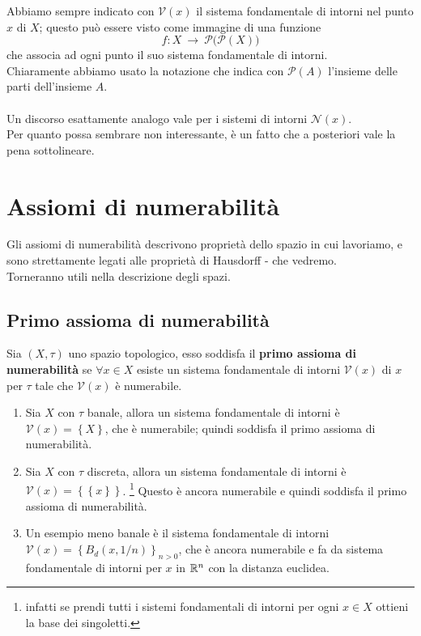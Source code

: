 \begin{remark} 
	Abbiamo sempre indicato con $\mathcal{V}(x)$ il sistema fondamentale di intorni nel punto $x$ di $X$; questo può essere visto come immagine di una funzione 
	\begin{equation*}
		f : X \ \rightarrow \ \mathcal{P}\big(\mathcal{P} (X) \big)
	\end{equation*}
	che associa ad ogni punto il suo sistema fondamentale di intorni. \\ Chiaramente abbiamo usato la notazione che indica con $\mathcal{P}(A)$ l'insieme delle parti dell'insieme $A$. \\ \\ Un discorso esattamente analogo vale per i sistemi di intorni $\mathcal{N}(x)$. \\ Per quanto possa sembrare non interessante, è un fatto che a posteriori vale la pena sottolineare.
\end{remark}


\newpage

\section{Assiomi di numerabilità}
Gli assiomi di numerabilità descrivono proprietà dello spazio in cui lavoriamo, e sono strettamente legati alle proprietà di Hausdorff - che vedremo. \\
Torneranno utili nella descrizione degli spazi.
\subsection{\textcolor{TopGener}{\textbf{Primo assioma di numerabilità}}}


\begin{definition}
	Sia $(X,\tau)$ uno spazio topologico, esso soddisfa il \textbf{primo assioma di numerabilità} se $\forall x \in X$ esiste un sistema fondamentale di intorni $\mathcal{V}(x)$ di $x$ per $\tau$ tale che $\mathcal{V}(x)$ è numerabile.
\end{definition}

\begin{example}	
\begin{enumerate}
	\item Sia $X$ con $\tau$ banale, allora un sistema fondamentale di intorni è $\mathcal{V}(x) = \left\{X\right\}$, che è numerabile; quindi soddisfa il primo assioma di numerabilità.
	\item Sia $X$ con $\tau$ discreta, allora un sistema fondamentale di intorni è $\mathcal{V}(x) = \left\{\left\{x\right\}\right\}$. 
	\footnote{infatti se prendi tutti i sistemi fondamentali di intorni per ogni $x\in X$ ottieni la base dei singoletti.} 
	Questo è ancora numerabile e quindi soddisfa il primo assioma di numerabilità.
	\item Un esempio meno banale è il sistema fondamentale di intorni $\mathcal{V}(x) = \left\{B_d(x, 1/n)\right\}_{n > 0}$, che è ancora numerabile e fa da sistema fondamentale di intorni per $x$ in $\mathbb{R}^n$ con la distanza euclidea.
\end{enumerate}
\end{example}



